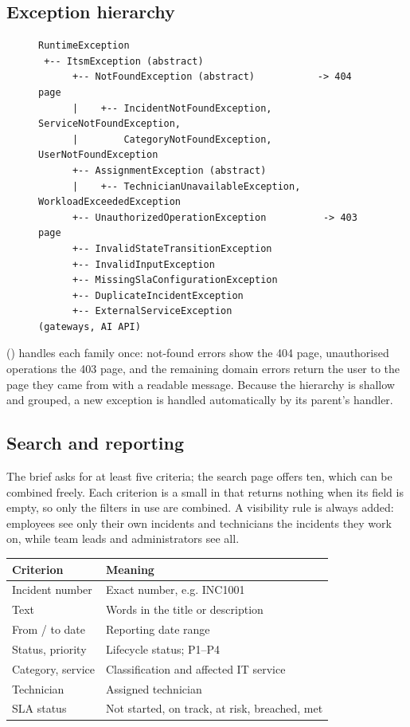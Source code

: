 \subsection{Exception hierarchy}
\begin{figure}[H]
\centering
\begin{minipage}{0.92\linewidth}
\begin{lstlisting}[language={},numbers=none,caption={Custom exceptions (all unchecked)}]
RuntimeException
 +-- ItsmException (abstract)
      +-- NotFoundException (abstract)           -> 404 page
      |    +-- IncidentNotFoundException, ServiceNotFoundException,
      |        CategoryNotFoundException, UserNotFoundException
      +-- AssignmentException (abstract)
      |    +-- TechnicianUnavailableException, WorkloadExceededException
      +-- UnauthorizedOperationException          -> 403 page
      +-- InvalidStateTransitionException
      +-- InvalidInputException
      +-- MissingSlaConfigurationException
      +-- DuplicateIncidentException
      +-- ExternalServiceException                (gateways, AI API)
\end{lstlisting}
\end{minipage}
\end{figure}
 () handles each family once: not-found errors show the 404 page, unauthorised operations the 403 page, and the remaining domain errors return the user to the page they came from with a readable message. Because the hierarchy is shallow and grouped, a new exception is handled automatically by its parent's handler.

\subsection{Search and reporting}
The brief asks for at least five criteria; the search page offers ten, which can be combined freely. Each criterion is a small  in  that returns nothing when its field is empty, so only the filters in use are combined. A visibility rule is always added: employees see only their own incidents and technicians the incidents they work on, while team leads and administrators see all.

\begin{tabularx}{\linewidth}{@{}L{3.4cm}Y@{}}
\toprule
\textbf{Criterion} & \textbf{Meaning} \\
\midrule
Incident number & Exact number, e.g. INC1001 \\
Text & Words in the title or description \\
From / to date & Reporting date range \\
Status, priority & Lifecycle status; P1--P4 \\
Category, service & Classification and affected IT service \\
Technician & Assigned technician \\
SLA status & Not started, on track, at risk, breached, met \\
\bottomrule
\end{tabularx}

